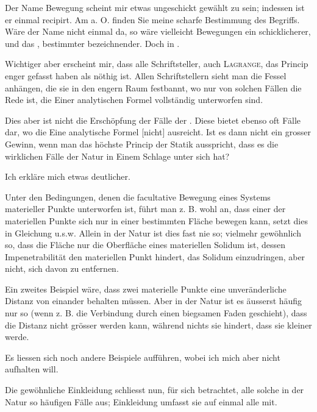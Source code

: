 Der Name  Bewegung scheint mir etwas ungeschickt gewählt
zu sein; indessen ist er einmal recipirt. Am a. O. finden Sie meine scharfe
Bestimmung des Begriffs. Wäre der Name nicht einmal da, so wäre vielleicht
 Bewegungen ein schicklicherer, und das , bestimmter bezeichnender. Doch in .

Wichtiger aber erscheint mir, dass alle Schriftsteller, auch \textsc{Lagrange}, das
Princip enger gefasst haben als nöthig ist. Allen Schriftstellern sieht man
die Fessel anhängen, die sie in den engern Raum festbannt, wo nur von
solchen Fällen die Rede ist, die Einer analytischen Formel vollständig unterworfen
sind.

Dies aber ist nicht die Erschöpfung der Fälle der . Diese bietet
ebenso oft Fälle dar, wo die Eine analytische Formel [nicht] ausreicht. Ist
es dann nicht ein grosser Gewinn, wenn man das höchste Princip der Statik
 ausspricht, dass es die wirklichen Fälle der Natur in Einem Schlage unter
sich hat?

Ich erkläre mich etwas deutlicher.

Unter den Bedingungen, denen die facultative Bewegung eines Systems
materieller Punkte unterworfen ist, führt man z. B. wohl an, dass einer der
materiellen Punkte sich nur in einer bestimmten Fläche bewegen kann, setzt
dies in Gleichung u.s.w. Allein in der Natur ist dies fast nie so; vielmehr
gewöhnlich so, dass die Fläche  nur die Oberfläche eines materiellen
Solidum ist, dessen Impenetrabilität den materiellen Punkt  hindert, 
das Solidum einzudringen, aber nicht, sich davon zu entfernen.

Ein zweites Beispiel wäre, dass zwei materielle Punkte eine unveränderliche
Distanz von einander behalten müssen. Aber in der Natur ist es
äusserst häufig nur so (wenn z. B. die Verbindung durch einen biegsamen
Faden geschieht), dass die Distanz nicht grösser werden kann, während nichts
sie hindert, dass sie kleiner werde.

Es liessen sich noch andere Beispiele aufführen, wobei ich mich aber
nicht aufhalten will.

Die gewöhnliche Einkleidung schliesst nun, für sich betrachtet, alle solche
\clearpage{}
\noindent in der Natur so häufigen Fälle aus;  Einkleidung umfasst sie auf einmal
alle mit.

